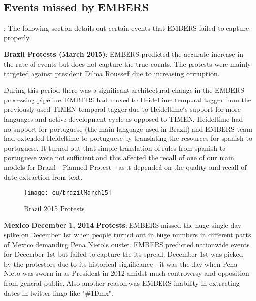\subsection{Events missed by EMBERS}:
The following section details out certain events that EMBERS failed to
capture properly.

\textbf{Brazil Protests (March 2015)}: EMBERS predicted the accurate
increase in the rate of events but does not capture the true counts. The
protests were mainly targeted against president Dilma Rousseff due to
increasing corruption. 

During this period there was a significant architectural change in the
EMBERS processing pipeline. EMBERS had moved to Heideltime temporal
tagger from the previously used TIMEN temporal tagger due to
Heideltime`s support for more languages and active development cycle as
opposed to TIMEN. Heideltime had no support for portuguese (the main
language used in Brazil) and EMBERS team had extended Heideltime to
portuguese by translating the resources for spanish to portuguese. It
turned out that simple translation of rules from spanish to portuguese
were not sufficient and this affected the recall of one of our main
models for Brazil - Planned Protest - as it depended on the quality and recall of
date extraction from text.

\begin{figure}[H]
\texttt{[image: cu/brazilMarch15]}
\caption{Brazil 2015 Protests}
\label{fig:brazilSpring}
\end{figure}


\textbf{Mexico December 1, 2014 Protests}:
EMBERS missed the huge single day spike on December 1st when
people turned out in huge numbers in different parts of Mexico demanding
Pena Nieto`s ouster.
EMBERS predicted nationwide events for December 1st but failed to
capture the its spread. December 1st was picked by the protestors due to
its historical significance - it was the day when Pena Nieto was sworn
in as President in 2012 amidst much controversy and opposition from
general public. Also another reason was EMBERS inability in
extracting dates in twitter lingo  like "\#1Dmx".




